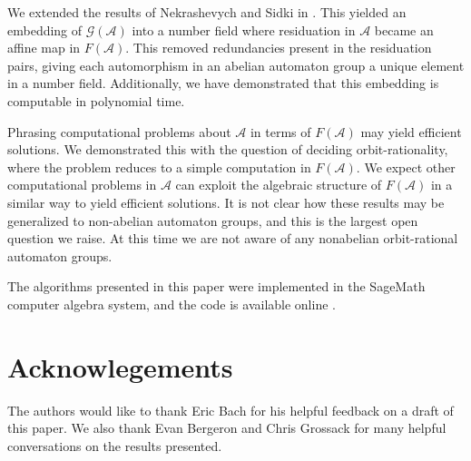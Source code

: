 \documentclass[12pt, letterpaper]{article}
\newcommand{\A}{\mathcal A}
\newcommand{\gp}{\mathcal G}
\begin{document}
We extended the results of Nekrashevych and Sidki in
\cite{nekrashevych2004automorphisms}.  This yielded an embedding of $\gp(\A)$
into a number field where residuation in $\A$ became an affine map in $F(\A)$.
This removed redundancies present in the residuation pairs, giving each
automorphism in an abelian automaton group a unique element in a number field.
Additionally, we have demonstrated that this embedding is computable in
polynomial time.

Phrasing computational problems about $\A$ in terms of $F(\A)$ may yield
efficient solutions. We demonstrated this with the question of deciding
orbit-rationality, where the problem reduces to a simple computation in
$F(\A)$. We expect other computational problems in $\A$ can exploit the
algebraic structure of $F(\A)$ in a similar way to yield efficient solutions.
It is not clear how these results may be generalized to non-abelian automaton
groups, and this is the largest open question we raise. At this time we are
not aware of any nonabelian orbit-rational automaton groups.

The algorithms presented in this paper were implemented in the SageMath
computer algebra system, and the code is available online \cite{Becker2018}.

\section{Acknowlegements}
The authors would like to thank Eric Bach for his helpful feedback on a draft
of this paper. We also thank Evan Bergeron and Chris Grossack for many helpful
conversations on the results presented.

\printbibliography
\end{document}
